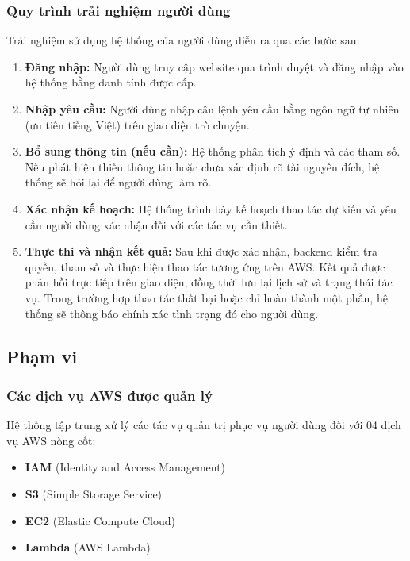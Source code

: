 \documentclass[a4paper,12pt]{article}
\begin{document}
\subsubsection{Quy trình trải nghiệm người dùng}
Trải nghiệm sử dụng hệ thống của người dùng diễn ra qua các bước sau:
\begin{enumerate}
  \item \textbf{Đăng nhập:} Người dùng truy cập website qua trình duyệt và đăng nhập vào hệ thống bằng danh tính được cấp.
  \item \textbf{Nhập yêu cầu:} Người dùng nhập câu lệnh yêu cầu bằng ngôn ngữ tự nhiên (ưu tiên tiếng Việt) trên giao diện trò chuyện.
  \item \textbf{Bổ sung thông tin (nếu cần):} Hệ thống phân tích ý định và các tham số. Nếu phát hiện thiếu thông tin hoặc chưa xác định rõ tài nguyên đích, hệ thống sẽ hỏi lại để người dùng làm rõ.
  \item \textbf{Xác nhận kế hoạch:} Hệ thống trình bày kế hoạch thao tác dự kiến và yêu cầu người dùng xác nhận đối với các tác vụ cần thiết.
  \item \textbf{Thực thi và nhận kết quả:} Sau khi được xác nhận, backend kiểm tra quyền, tham số và thực hiện thao tác tương ứng trên AWS. Kết quả được phản hồi trực tiếp trên giao diện, đồng thời lưu lại lịch sử và trạng thái tác vụ. Trong trường hợp thao tác thất bại hoặc chỉ hoàn thành một phần, hệ thống sẽ thông báo chính xác tình trạng đó cho người dùng.
\end{enumerate}

\subsection{Phạm vi}

\subsubsection{Các dịch vụ AWS được quản lý}
Hệ thống tập trung xử lý các tác vụ quản trị phục vụ người dùng đối với 04 dịch vụ AWS nòng cốt:
\begin{itemize}
  \item \textbf{IAM} (Identity and Access Management)
  \item \textbf{S3} (Simple Storage Service)
  \item \textbf{EC2} (Elastic Compute Cloud)
  \item \textbf{Lambda} (AWS Lambda)
\end{itemize}
\end{document}
